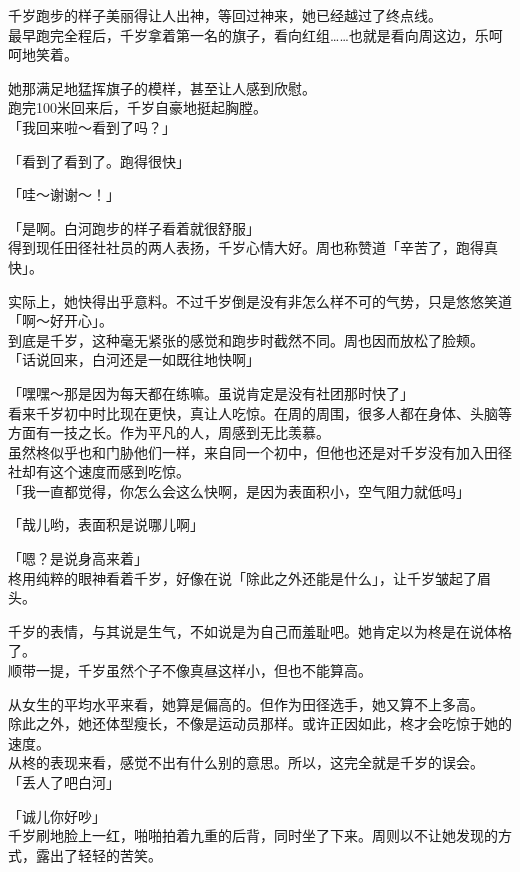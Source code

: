 千岁跑步的样子美丽得让人出神，等回过神来，她已经越过了终点线。\\

最早跑完全程后，千岁拿着第一名的旗子，看向红组……也就是看向周这边，乐呵呵地笑着。

她那满足地猛挥旗子的模样，甚至让人感到欣慰。\\

跑完100米回来后，千岁自豪地挺起胸膛。\\

「我回来啦～看到了吗？」

「看到了看到了。跑得很快」

「哇～谢谢～！」

「是啊。白河跑步的样子看着就很舒服」\\

得到现任田径社社员的两人表扬，千岁心情大好。周也称赞道「辛苦了，跑得真快」。

实际上，她快得出乎意料。不过千岁倒是没有非怎么样不可的气势，只是悠悠笑道「啊～好开心」。\\

到底是千岁，这种毫无紧张的感觉和跑步时截然不同。周也因而放松了脸颊。\\

「话说回来，白河还是一如既往地快啊」

「嘿嘿～那是因为每天都在练嘛。虽说肯定是没有社团那时快了」\\

看来千岁初中时比现在更快，真让人吃惊。在周的周围，很多人都在身体、头脑等方面有一技之长。作为平凡的人，周感到无比羡慕。\\

虽然柊似乎也和门胁他们一样，来自同一个初中，但他也还是对千岁没有加入田径社却有这个速度而感到吃惊。\\

「我一直都觉得，你怎么会这么快啊，是因为表面积小，空气阻力就低吗」

「哉儿哟，表面积是说哪儿啊」

「嗯？是说身高来着」\\

柊用纯粹的眼神看着千岁，好像在说「除此之外还能是什么」，让千岁皱起了眉头。

千岁的表情，与其说是生气，不如说是为自己而羞耻吧。她肯定以为柊是在说体格了。\\

顺带一提，千岁虽然个子不像真昼这样小，但也不能算高。

从女生的平均水平来看，她算是偏高的。但作为田径选手，她又算不上多高。\\

除此之外，她还体型瘦长，不像是运动员那样。或许正因如此，柊才会吃惊于她的速度。\\

从柊的表现来看，感觉不出有什么别的意思。所以，这完全就是千岁的误会。\\

「丢人了吧白河」

「诚儿你好吵」\\

千岁刷地脸上一红，啪啪拍着九重的后背，同时坐了下来。周则以不让她发现的方式，露出了轻轻的苦笑。
